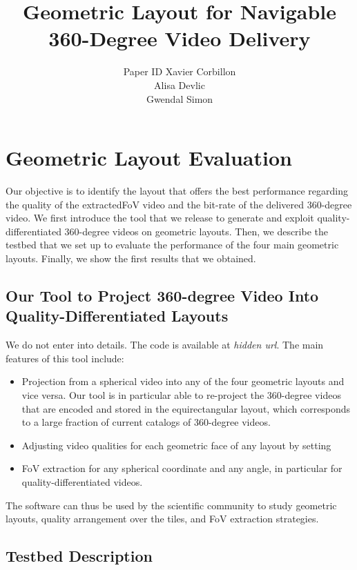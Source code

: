 \documentclass{sig-alternate}
\title{Geometric Layout for Navigable 360-Degree Video Delivery}
\author{ 
\alignauthor
\ifdoubleBlinded
        Paper ID 
\else
  Xavier Corbillon\\
  \affaddr{T\'{e}l\'{e}com Bretagne, IRISA, France}%
\alignauthor
  Alisa Devlic\\
  \affaddr{T\'{e}l\'{e}com Bretagne, IRISA, France}%
\alignauthor
  Gwendal Simon\\
  \affaddr{T\'{e}l\'{e}com Bretagne, IRISA, France}%
\fi
}
\begin{document}

\maketitle







\section{Geometric Layout Evaluation}

Our objective is to identify the layout that offers the best performance regarding the quality of 
the extracted\ac{FoV} video and the bit-rate of the delivered 360-degree video. We first introduce 
the tool that we release to generate and exploit quality-differentiated
360-degree videos on geometric layouts. Then, we describe the testbed that we set up to evaluate the
performance of the four main geometric layouts. Finally, we show the first results that we obtained.

\subsection{Our Tool to Project 360-degree Video Into Quality-Differentiated Layouts}

We do not enter into details. The code is available at \textit{hidden url}. The main features of this tool include:
\begin{itemize}
\item Projection from a spherical video into any of the four geometric layouts and vice versa. Our tool is in 
particular able to re-project the 360-degree videos that are encoded and stored in the equirectangular layout,
which corresponds to a large fraction of current catalogs of 360-degree videos. 
\item Adjusting video qualities for each geometric face of any layout by setting 
\item \ac{FoV} extraction for any spherical coordinate and any angle, in particular for quality-differentiated videos.
\end{itemize}

The software can thus be used by the scientific community to study geometric layouts, quality arrangement over the tiles, and \ac{FoV} extraction strategies.

\subsection{Testbed Description}
\end{document}
